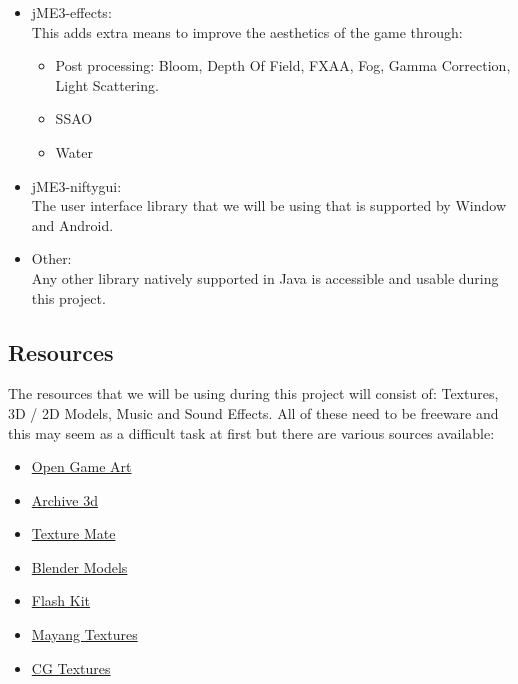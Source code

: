 \documentclass[letterpaper]{article}
\begin{document}
\begin{itemize}
				\item jME3-effects:\\
					This adds extra means to improve the aesthetics of the game through:
						\begin{itemize}
							\item Post processing: Bloom, Depth Of Field, FXAA, Fog, Gamma Correction, Light Scattering.
							\item SSAO
							\item Water
						\end{itemize}
					
				\item jME3-niftygui: \\
					The user interface library that we will be using that is supported by Window and Android.
				
				\item Other: \\
				Any other library natively supported in Java is accessible and usable during this project.
			
			\end{itemize}
			
			\vspace{0.1cm}
			
			\subsection*{Resources}
			
			\vspace{0.1cm}
			
			The resources that we will be using during this project will consist of: Textures, 3D / 2D Models, Music and Sound Effects. All of these need to be freeware and this may seem as a difficult task at first but there are various sources available:
			\begin{itemize}
				\item \href{http://www.opengameart.org}{Open Game Art}
				\item \href{http://www.archive3d.net}{Archive 3d}
				\item \href{http://www.texturemate.com}{Texture Mate}
				\item \href{http://www.blender-models.com}{Blender Models}
				\item \href{http://www.flashkit.com}{Flash Kit}
				\item \href{http://www.mayang.com/textures/}{Mayang Textures}
				\item \href{http://www.cgtextures.com}{CG Textures}
			\end{itemize}
\end{document}
